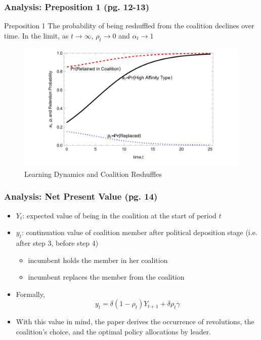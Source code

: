 \documentclass[10pt,handout]{beamer}
\begin{document}
\begin{frame}
\frametitle{Analysis: Preposition 1 (pg. 12-13)}
\vfill
\begin{block}{Preposition 1}
    The probability of being reshuffled from the coalition declines over time. In the limit, as $t \xrightarrow[]{} \infty$, $\rho_t \xrightarrow[]{} 0$ and $\alpha_t \xrightarrow[]{} 1$
\end{block}
\begin{figure}
    \centering
    \includegraphics[width=0.75\linewidth]{Figure2.jpeg}
    \caption{Learning Dynamics and Coalition Reshuffles}
    \label{fig:enter-label}
\end{figure}
\end{frame}

\begin{frame}
\frametitle{Analysis: Net Present Value (pg. 14)}
\begin{itemize}
    \item $Y_t$: expected value of being in the coalition at the start of period $t$
    \item $y_t$: continuation value of coalition member after political deposition stage (i.e. after step 3, before step 4)
    \begin{itemize}
        \item incumbent holds the member in her coalition
        \item incumbent replaces the member from the coalition
    \end{itemize}
    \item Formally,
    \[
        y_t = \delta(1-\rho_t)Y_{t+1} + \delta\rho_t\gamma
    \]
    \item With this value in mind, the paper derives the occurrence of revolutions, the coalition's choice, and the optimal policy allocations by leader.
\end{itemize}
\end{frame}
\end{document}
